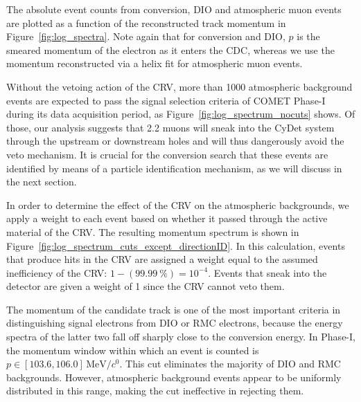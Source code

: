 The absolute event counts from conversion, DIO and atmospheric muon events are
plotted as a function of the reconstructed track momentum in
Figure~\ref{fig:log_spectra}. Note again that for conversion and DIO, $p$ is the
smeared momentum of the electron as it enters the CDC, whereas we use the
momentum reconstructed via a helix fit for atmospheric muon events.

Without the vetoing action of the CRV, more than 1000 atmospheric background
events are expected to pass the signal selection criteria of COMET
Phase\nobreakdash-I during its data acquisition period, as
Figure~\ref{fig:log_spectrum_nocuts} shows. Of those, our analysis suggests that
2.2 muons will sneak into the CyDet system through the upstream or downstream
holes and will thus dangerously avoid the veto mechanism. It is crucial for the
conversion search that these events are identified by means of a particle
identification mechanism, as we will discuss in the next section.


In order to determine the effect of the CRV on the atmospheric backgrounds, we
apply a weight to each event based on whether it passed through the active
material of the CRV. The resulting momentum spectrum is shown in
Figure~\ref{fig:log_spectrum_cuts_except_directionID}. In this calculation,
events that produce hits in the CRV are assigned a weight equal to the assumed
inefficiency of the CRV: $1 - (\SI{99.99}{\percent}) = 10^{-4}$. Events that
sneak into the detector are given a weight of 1 since the CRV cannot veto them.






The momentum of the candidate track is one of the most important criteria in
distinguishing signal electrons from DIO or RMC
electrons, because the energy spectra of the latter two fall off sharply close
to the conversion energy. In Phase\nobreakdash-I, the momentum window within which an event
is counted is $p \in [103.6, 106.0]\,\si{\MeV/\clight}$. This cut eliminates the
majority of DIO and RMC backgrounds. However, atmospheric background events
appear to be uniformly distributed in this range, making the cut ineffective in
rejecting them. 

